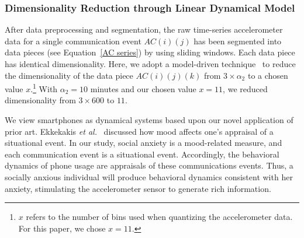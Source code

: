\subsubsection{Dimensionality Reduction through Linear Dynamical Model}

After data preprocessing and segmentation, the raw time-series accelerometer data for a single communication event $AC(i)(j)$ has been segmented into data pieces (see Equation~\ref{AC series}) by using sliding windows. Each data piece has identical dimensionality. Here, we adopt a model-driven technique~\cite{gong2016piecewise} to reduce the dimensionality of the data piece $AC(i)(j)(k)$ from $3 \times \alpha_2$ to a chosen value $x$.\footnote{$x$ refers to the number of bins used when quantizing the accelerometer data.  For this paper, we chose $x=11$.}  With $\alpha_2=10$ minutes and our chosen value $x=11$, we reduced dimensionality from $3 \times 600$ to $11$.

We view smartphones as dynamical systems based upon our novel application of prior art.  Ekkekakis \emph{et al.}~\cite{ekkekakis2013measurement} discussed how mood affects one's appraisal of a situational event.  In our study, social anxiety is a mood-related measure, and each communication event is a situational event.  Accordingly, the behavioral dynamics of phone usage are appraisals of these communications events.  Thus, a socially anxious individual will produce behavioral dynamics consistent with her anxiety, stimulating the accelerometer sensor to generate rich information. 
% 
% 



